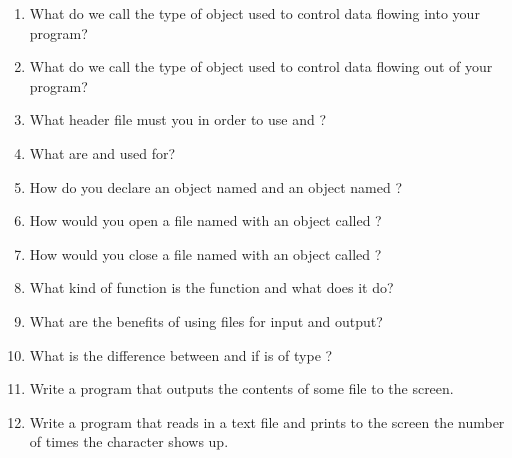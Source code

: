 \begin{enumerate}
\item What do we call the type of object used to control data flowing into your program?
\item What do we call the type of object used to control data flowing out of your program?
\item What header file must you  in order to use  and ?
\item What are  and  used for?
\item How do you declare an  object named  and an  object named ?
\item How would you open a file named  with an  object called ?
\item How would you close a file named  with an  object called ?
\item What kind of function is the  function and what does it do?
\item What are the benefits of using files for input and output?
\item What is the difference between  and  if  is of type ?
\item Write a program that outputs the contents of some file to the screen.
\item Write a program that reads in a text file and prints to the screen the number of times the character  shows up.
\end{enumerate}


